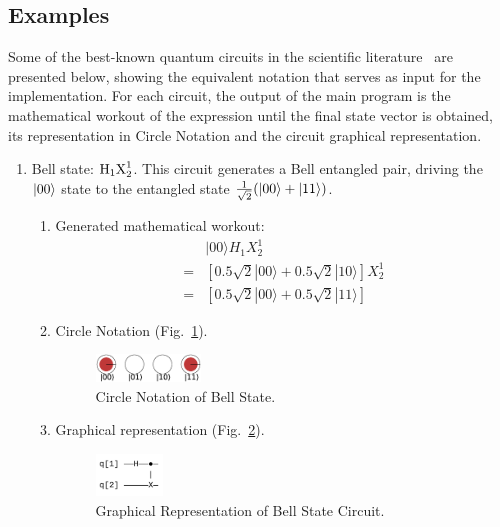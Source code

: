 \documentclass[sigconf,natbib=false]{acmart}
\begin{document}
    \subsection{Examples}
    Some of the best-known quantum circuits in the scientific literature~\cite{Nielsen_Chuang_2010} are presented below, showing the equivalent notation that serves as input for the implementation. For each circuit, the output of the main program is the mathematical workout of the expression until the final state vector is obtained, its representation in Circle Notation and the circuit graphical representation.
    
    \begin{enumerate} %
		\item Bell state: $\text{H}_1\text{X}^{1}_{2}$. This circuit generates a Bell entangled pair, driving the $\ket{00}$ state to the entangled state $\frac{1}{\sqrt{2}}(\ket{00} + \ket{11})$.
        \begin{enumerate}
            \item Generated mathematical workout:
			\begin{align*}
			&|00\rangle H_{1}X_{2}^{1} \\
			=& [0.5 \sqrt{2} |00\rangle +0.5 \sqrt{2} |10\rangle ]X_{2}^{1} \\
			=& [0.5 \sqrt{2} |00\rangle +0.5 \sqrt{2} |11\rangle ]
			\end{align*}
            \item Circle Notation (Fig.~\ref{bell_state}). 
            \begin{figure}[!htb]
                \centerline{\includegraphics[width=0.28\textwidth]{bell_state}}
                \caption{Circle Notation of Bell State.}
                \label{bell_state}
            \end{figure}
            \item Graphical representation (Fig.~\ref{bell_state_qc}).
            \begin{figure}[!htb]
                \centerline{\includegraphics[width=0.18\textwidth]{bell_state_qc}}
                \caption{Graphical Representation of Bell State Circuit.}
                \label{bell_state_qc}
            \end{figure}
        \end{enumerate}
        

\end{enumerate}
\end{document}
